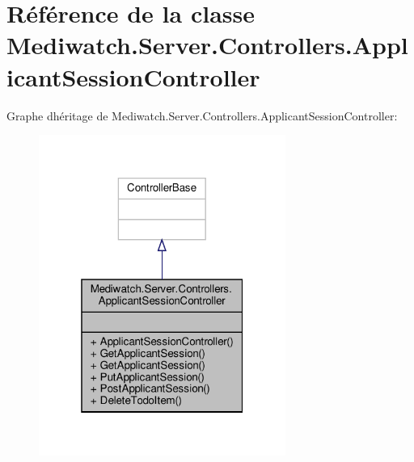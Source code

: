 \hypertarget{class_mediwatch_1_1_server_1_1_controllers_1_1_applicant_session_controller}{}\section{Référence de la classe Mediwatch.\+Server.\+Controllers.\+Applicant\+Session\+Controller}
\label{class_mediwatch_1_1_server_1_1_controllers_1_1_applicant_session_controller}


Graphe d\textquotesingle{}héritage de Mediwatch.\+Server.\+Controllers.\+Applicant\+Session\+Controller\+:
\nopagebreak
\begin{figure}[H]
\begin{center}
\leavevmode
\includegraphics[width=229pt]{class_mediwatch_1_1_server_1_1_controllers_1_1_applicant_session_controller__inherit__graph}
\end{center}
\end{figure}



